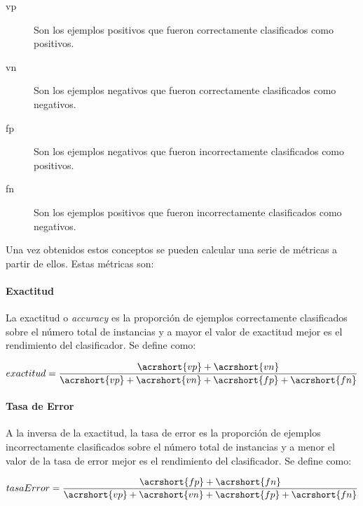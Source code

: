 \begin{description}

	\item[\acrfull{vp}] Son los ejemplos positivos que fueron correctamente
	      clasificados como positivos.

	\item[\acrfull{vn}] Son los ejemplos negativos que fueron correctamente
	      clasificados como negativos.

	\item[\acrfull{fp}] Son los ejemplos negativos que fueron incorrectamente
	      clasificados como positivos.

	\item[\acrfull{fn}] Son los ejemplos positivos que fueron incorrectamente
	      clasificados como negativos.

\end{description}

Una vez obtenidos estos conceptos se pueden calcular una serie de métricas a
partir de ellos. Estas métricas son:

\paragraph{Exactitud}
\label{evaluacion_metricas_exactitud}

La exactitud o \textit{accuracy} es la proporción de ejemplos correctamente
clasificados sobre el número total de instancias y a mayor el valor de exactitud
mejor es el rendimiento del clasificador. Se define  como:

\begin{equation}
	exactitud = \frac{\acrshort{vp} + \acrshort{vn}}{\acrshort{vp} +
		\acrshort{vn} + \acrshort{fp} + \acrshort{fn}}
\end{equation}

\paragraph{Tasa de Error}

A la inversa de la exactitud, la tasa de error es la proporción de ejemplos
incorrectamente clasificados sobre el número total de instancias y a menor el
valor de la tasa de error mejor es el rendimiento del clasificador. Se define
como:

\begin{equation}
	tasaError = \frac{\acrshort{fp} + \acrshort{fn}}{\acrshort{vp} +
		\acrshort{vn} + \acrshort{fp} + \acrshort{fn}}
\end{equation}

